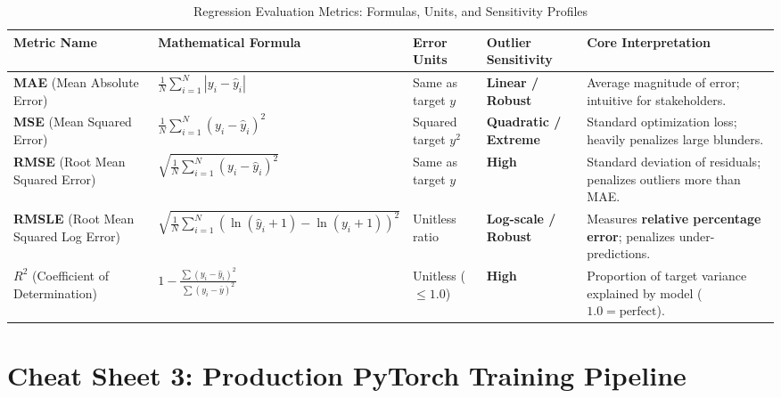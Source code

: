 \begin{table}[htbp]
\centering
\scriptsize
\caption{Regression Evaluation Metrics: Formulas, Units, and Sensitivity Profiles}\label{tab:metrics_regression}
\begin{tabular}{@{}p{2.8cm}p{4.2cm}p{2.2cm}p{2.8cm}p{2.6cm}@{}}
\toprule
\textbf{Metric Name} & \textbf{Mathematical Formula} & \textbf{Error Units} & \textbf{Outlier Sensitivity} & \textbf{Core Interpretation} \\ \midrule
\textbf{MAE} (Mean Absolute Error) & 
$\frac{1}{N} \sum_{i=1}^N |y_i - \hat{y}_i|$ & 
Same as target $y$ & 
\textbf{Linear / Robust} & 
Average magnitude of error; intuitive for stakeholders. \\ \addlinespace

\textbf{MSE} (Mean Squared Error) & 
$\frac{1}{N} \sum_{i=1}^N (y_i - \hat{y}_i)^2$ & 
Squared target $y^2$ & 
\textbf{Quadratic / Extreme} & 
Standard optimization loss; heavily penalizes large blunders. \\ \addlinespace

\textbf{RMSE} (Root Mean Squared Error) & 
$\sqrt{\frac{1}{N} \sum_{i=1}^N (y_i - \hat{y}_i)^2}$ & 
Same as target $y$ & 
\textbf{High} & 
Standard deviation of residuals; penalizes outliers more than MAE. \\ \addlinespace

\textbf{RMSLE} (Root Mean Squared Log Error) & 
$\sqrt{\frac{1}{N} \sum_{i=1}^N (\ln(\hat{y}_i+1) - \ln(y_i+1))^2}$ & 
Unitless ratio & 
\textbf{Log-scale / Robust} & 
Measures \textbf{relative percentage error}; penalizes under-predictions. \\ \addlinespace

\textbf{$R^2$} (Coefficient of Determination) & 
$1 - \frac{\sum (y_i - \hat{y}_i)^2}{\sum (y_i - \bar{y})^2}$ & 
Unitless ($\le 1.0$) & 
\textbf{High} & 
Proportion of target variance explained by model ($1.0 = \text{perfect}$). \\ \bottomrule
\end{tabular}
\end{table}

\section{Cheat Sheet 3: Production PyTorch Training Pipeline}\label{sec:cs_pytorch}

